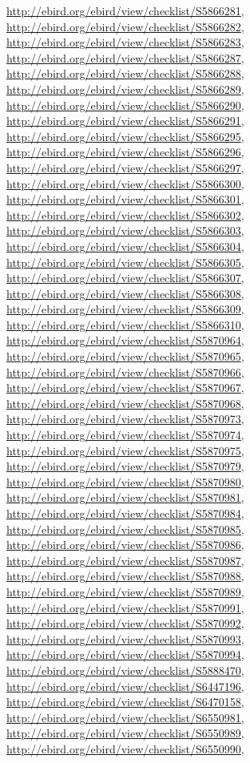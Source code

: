 \documentclass[9pt, article]{memoir}
\begin{document}
\begin{multicols}{2}
\url{http://ebird.org/ebird/view/checklist/S5866281}, 
\url{http://ebird.org/ebird/view/checklist/S5866282}, 
\url{http://ebird.org/ebird/view/checklist/S5866283}, 
\url{http://ebird.org/ebird/view/checklist/S5866287}, 
\url{http://ebird.org/ebird/view/checklist/S5866288}, 
\url{http://ebird.org/ebird/view/checklist/S5866289}, 
\url{http://ebird.org/ebird/view/checklist/S5866290}, 
\url{http://ebird.org/ebird/view/checklist/S5866291}, 
\url{http://ebird.org/ebird/view/checklist/S5866295}, 
\url{http://ebird.org/ebird/view/checklist/S5866296}, 
\url{http://ebird.org/ebird/view/checklist/S5866297}, 
\url{http://ebird.org/ebird/view/checklist/S5866300}, 
\url{http://ebird.org/ebird/view/checklist/S5866301}, 
\url{http://ebird.org/ebird/view/checklist/S5866302}, 
\url{http://ebird.org/ebird/view/checklist/S5866303}, 
\url{http://ebird.org/ebird/view/checklist/S5866304}, 
\url{http://ebird.org/ebird/view/checklist/S5866305}, 
\url{http://ebird.org/ebird/view/checklist/S5866307}, 
\url{http://ebird.org/ebird/view/checklist/S5866308}, 
\url{http://ebird.org/ebird/view/checklist/S5866309}, 
\url{http://ebird.org/ebird/view/checklist/S5866310}, 
\url{http://ebird.org/ebird/view/checklist/S5870964}, 
\url{http://ebird.org/ebird/view/checklist/S5870965}, 
\url{http://ebird.org/ebird/view/checklist/S5870966}, 
\url{http://ebird.org/ebird/view/checklist/S5870967}, 
\url{http://ebird.org/ebird/view/checklist/S5870968}, 
\url{http://ebird.org/ebird/view/checklist/S5870973}, 
\url{http://ebird.org/ebird/view/checklist/S5870974}, 
\url{http://ebird.org/ebird/view/checklist/S5870975}, 
\url{http://ebird.org/ebird/view/checklist/S5870979}, 
\url{http://ebird.org/ebird/view/checklist/S5870980}, 
\url{http://ebird.org/ebird/view/checklist/S5870981}, 
\url{http://ebird.org/ebird/view/checklist/S5870984}, 
\url{http://ebird.org/ebird/view/checklist/S5870985}, 
\url{http://ebird.org/ebird/view/checklist/S5870986}, 
\url{http://ebird.org/ebird/view/checklist/S5870987}, 
\url{http://ebird.org/ebird/view/checklist/S5870988}, 
\url{http://ebird.org/ebird/view/checklist/S5870989}, 
\url{http://ebird.org/ebird/view/checklist/S5870991}, 
\url{http://ebird.org/ebird/view/checklist/S5870992}, 
\url{http://ebird.org/ebird/view/checklist/S5870993}, 
\url{http://ebird.org/ebird/view/checklist/S5870994}, 
\url{http://ebird.org/ebird/view/checklist/S5888470}, 
\url{http://ebird.org/ebird/view/checklist/S6447196}, 
\url{http://ebird.org/ebird/view/checklist/S6470158}, 
\url{http://ebird.org/ebird/view/checklist/S6550981}, 
\url{http://ebird.org/ebird/view/checklist/S6550989}, 
\url{http://ebird.org/ebird/view/checklist/S6550990}, 

\end{multicols}
\end{document}
